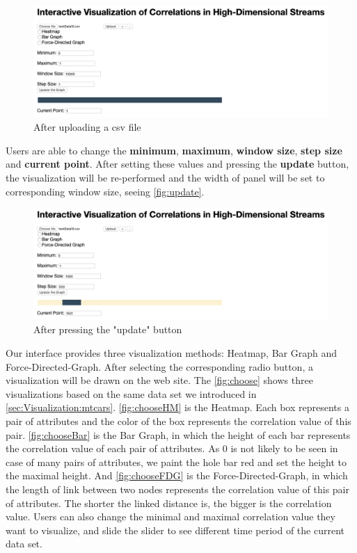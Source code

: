 \begin{figure}[h]
	\centering
	\includegraphics[width=15cm]{pictures/uploaded}
	\caption{After uploading a csv file}
	\label{fig:uploaded}
\end{figure}

Users are able to change the \textbf{minimum}, \textbf{maximum}, \textbf{window size}, \textbf{step size} and \textbf{current point}. After setting these values and pressing the \textbf{update} button, the visualization will be re-performed and the width of panel will be set to corresponding window size, seeing \autoref{fig:update}.\\

\begin{figure}[h]
	\centering
	\includegraphics[width=15cm]{pictures/update}
	\caption{After pressing the "update" button}
	\label{fig:update}
\end{figure}

Our interface provides three visualization methods: Heatmap, Bar Graph and Force-Directed-Graph. After selecting the corresponding radio button, a visualization will be drawn on the web site. The \autoref{fig:choose} shows three visualizations based on the same data set we introduced in \autoref{sec:Visualization:mtcars}. \autoref{fig:chooseHM} is the Heatmap. Each box represents a pair of attributes and the color of the box represents the correlation value of this pair. \autoref{fig:chooseBar} is the Bar Graph, in which the height of each bar represents the correlation value of each pair of attributes. As 0 is not likely to be seen in case of many pairs of attributes, we paint the hole bar red and set the height to the maximal height. And \autoref{fig:chooseFDG} is the Force-Directed-Graph, in which the length of link between two nodes represents the correlation value of this pair of attributes. The shorter the linked distance is, the bigger is the correlation value. Users can also change the minimal and maximal correlation value they want to visualize, and slide the slider to see different time period of the current data set.


